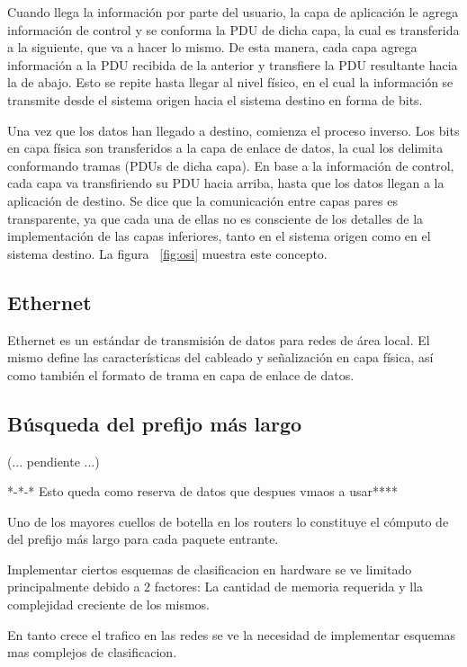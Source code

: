 Cuando llega la información por parte del usuario, la capa de aplicación le agrega información de control y se conforma la PDU de dicha capa, la cual es transferida a la siguiente, que va a hacer lo mismo. De esta manera, cada capa agrega información a la PDU recibida de la anterior y transfiere la PDU resultante hacia la de abajo. Esto se repite hasta llegar al nivel físico, en el cual la información se transmite desde el sistema origen hacia el sistema destino en forma de bits.

Una vez que los datos han llegado a destino, comienza el proceso inverso. Los bits en capa física son transferidos a la capa de enlace de datos, la cual los delimita conformando tramas (PDUs de dicha capa). En base a la información de control, cada capa va transfiriendo su PDU hacia arriba, hasta que los datos llegan a la aplicación de destino. Se dice que la comunicación entre capas pares es transparente, ya que cada una de ellas no es consciente de los detalles de la implementación de las capas inferiores, tanto en el sistema origen como en el sistema destino. La figura ~\ref{fig:osi} muestra este concepto.

\subsection{Ethernet}

Ethernet es un estándar de transmisión de datos para redes de área local. El mismo define las características del cableado y señalización en capa física, así como también el formato de trama en capa de enlace de datos.



\subsection{Búsqueda del prefijo más largo}

(... pendiente ...)


*-*-* Esto queda como reserva de datos que despues vmaos a usar****

Uno de los mayores cuellos de botella en los routers lo constituye el cómputo de del prefijo más largo para cada paquete entrante.

Implementar ciertos esquemas de clasificacion en hardware se ve limitado principalmente debido a 2 factores: La cantidad de memoria requerida y lla complejidad creciente de los mismos.

En tanto crece el trafico en las redes se ve la necesidad de implementar esquemas mas complejos de clasificacion.

